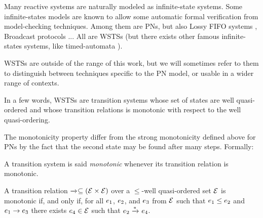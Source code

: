 Many reactive systems are naturally modeled as infinite-state systems.
Some infinite-states models are known to allow some automatic formal verification from model-checking techniques.
Among them are \acp{PN}, but also Lossy FIFO systems \citep{Abdulla98}, Broadcast protocols \citep{Emerson98}...
All are \acp{WSTS} (but there exists other famous infinite-states systems, like timed-automata \citep{Alur94}).

\acp{WSTS} are outside of the range of this work, but we will sometimes refer to them to distinguish between techniques specific to the \ac{PN} model, or usable in a wider range of contexts.

In a few words, \acp{WSTS} are transition systems whose set of states are well quasi-ordered and whose transition relations is monotonic with respect to the well quasi-ordering.

The monotonicity property differ from the strong monotonicity defined above for \acp{PN} by the fact that the second state may be found after many steps. Formally:
\begin{defi}[Monotonicity]
  A transition system is said \emph{monotonic} whenever  its transition relation is monotonic.

  A transition relation $\xrightarrow{}_{} \subseteq (\mathcal{E} \times \mathcal{E})$ over a $\leq$-well quasi-ordered set $\mathcal{E}$ is monotonic if, and only if, for all $e_1$, $e_2$, and $e_3$ from $\mathcal{E}$ such that $e_1 \leq e_2$ and $e_1 \rightarrow e_3$ there exists $e_4 \in \mathcal{E}$ such that $e_2 \xrightarrow{*}_{} e_4$.
\end{defi}
